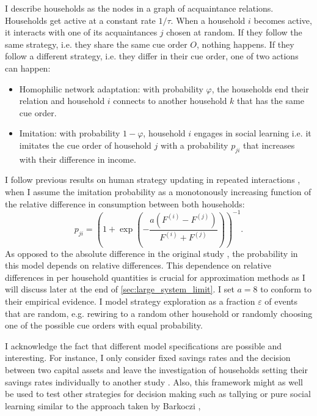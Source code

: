 I describe households as the nodes in a graph of acquaintance relations. Households get active at a constant rate $1/\tau$. When a household $i$ becomes active, it interacts with one of its acquaintances $j$ chosen at random. If they follow the same strategy, i.e. they share the same cue order $O$, nothing happens. If they follow a different strategy, i.e. they differ in their cue order, one of two actions can happen:
\begin{itemize}
	\item Homophilic network adaptation: with probability $\varphi$, the households end their relation and household $i$ connects to another household $k$ that has the same cue order. 
	\item Imitation: with probability $1-\varphi$, household $i$ engages in social learning i.e. it imitates the cue order of household $j$ with a probability $p_{ji}$ that increases with their difference in income.
\end{itemize}
I follow previous results on human strategy updating in repeated interactions \cite{Traulsen2010}, when I assume the imitation probability as a monotonously increasing function of the relative difference in consumption between both households:
\begin{equation}
	p_{ji} =  \left(1 + \exp \left(- \frac{a(F^{(i)} - F^{(j)})}{F^{(i)} + F^{(j)}} \right) \right)^{-1}.
    \label{eq:imitation_probability}
\end{equation}
As opposed to the absolute difference in the original study \cite{Traulsen2010}, the probability in this model depends on relative differences. This dependence on relative differences in per household quantities is crucial for approximation methods as I will discuss later at the end of \ref{sec:large_system_limit}.
I set $a = 8$ to conform to their empirical evidence.
I model strategy exploration as a fraction $\varepsilon$ of events that are random, e.g. rewiring to a random other household or randomly choosing one of the possible cue orders with equal probability.

I acknowledge the fact that different model specifications are possible and interesting.
For instance, I only consider fixed savings rates and the decision between two capital assets and leave the investigation of households setting their savings rates individually to another study \cite{Asano2018}.
Also, this framework might as well be used to test other strategies for decision making such as tallying or pure social learning similar to the approach taken by Barkoczi \cite{Barkoczi2013}, \cite{Barkoczi2016}

